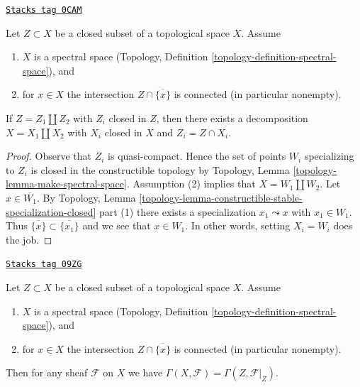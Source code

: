 \begin{lemma}
\label{etale-cohomology-lemma-connected-topological}
\href{https://stacks.math.columbia.edu/tag/0CAM}{\texttt{Stacks tag 0CAM}}

Let $Z \subset X$ be a closed subset of a topological space $X$.
Assume
\begin{enumerate}
\item $X$ is a spectral space
(Topology, Definition \ref{topology-definition-spectral-space}), and
\item for $x \in X$ the intersection $Z \cap \overline{\{x\}}$
is connected (in particular nonempty).
\end{enumerate}
If $Z = Z_1 \amalg Z_2$ with $Z_i$ closed in $Z$,
then there exists a decomposition $X = X_1 \amalg X_2$ with
$X_i$ closed in $X$ and $Z_i = Z \cap X_i$.
\end{lemma}

\begin{proof}
Observe that $Z_i$ is quasi-compact. Hence the set of points
$W_i$ specializing to $Z_i$ is closed in the constructible topology
by Topology, Lemma \ref{topology-lemma-make-spectral-space}.
Assumption (2) implies that $X = W_1 \amalg W_2$.
Let $x \in \overline{W_1}$. By Topology, Lemma
\ref{topology-lemma-constructible-stable-specialization-closed} part (1)
there exists a specialization $x_1 \leadsto x$ with $x_1 \in W_1$.
Thus $\overline{\{x\}} \subset \overline{\{x_1\}}$ and we see
that $x \in W_1$. In other words, setting $X_i = W_i$ does the job.
\end{proof}

\begin{lemma}[H0 topological]
\label{etale-cohomology-lemma-h0-topological}
\href{https://stacks.math.columbia.edu/tag/09ZG}{\texttt{Stacks tag 09ZG}}

Let $Z \subset X$ be a closed subset of a topological space $X$.
Assume
\begin{enumerate}
\item $X$ is a spectral space
(Topology, Definition \ref{topology-definition-spectral-space}), and
\item for $x \in X$ the intersection $Z \cap \overline{\{x\}}$
is connected (in particular nonempty).
\end{enumerate}
Then for any sheaf $\mathcal{F}$ on $X$ we have
$\Gamma(X, \mathcal{F}) = \Gamma(Z, \mathcal{F}|_Z)$.
\end{lemma}

